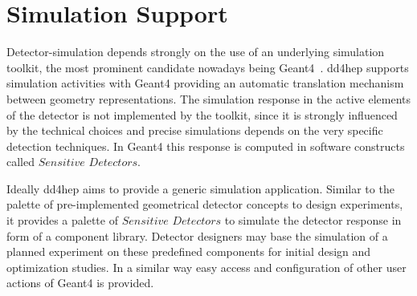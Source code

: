 \documentclass[a4paper]{jpconf}
\begin{document}
\section{Simulation Support}
\label{subsect:simulation-support}
\noindent
Detector-simulation depends strongly on the use of an underlying simulation toolkit, 
the most prominent candidate nowadays being Geant4~\cite{bib:geant4}.
dd4hep supports simulation activities with Geant4 providing
an automatic translation mechanism between geometry representations.
The simulation response in the active elements of the detector
is not implemented by the toolkit, since it is strongly influenced by the technical 
choices and precise simulations depends on the very specific detection techniques.
In Geant4 this response is computed in software constructs called $Sensitive$ 
$Detectors$.

\noindent
Ideally dd4hep aims to provide a generic simulation application.
Similar to the palette of pre-implemented geometrical detector 
concepts to design experiments, it provides a palette of $Sensitive$
$Detectors$ to simulate the detector response in form of a component library.
Detector designers may base the simulation of a planned experiment 
on these predefined components for initial design and optimization 
studies.  In a similar way easy access
and configuration of other user actions of Geant4 is provided.

\end{document}
